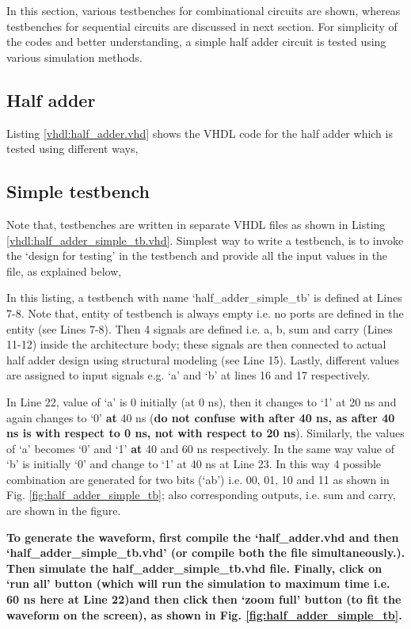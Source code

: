 In this section, various testbenches for combinational circuits are shown, whereas testbenches for sequential circuits are discussed in next section. For simplicity of the codes and better understanding, a simple half adder circuit is tested using various simulation methods. 

\subsection{Half adder}
Listing \ref{vhdl:half_adder.vhd} shows the VHDL code for the half adder which is tested using different ways, 




\subsection{Simple testbench}

Note that, testbenches are written in separate VHDL files as shown in Listing \ref{vhdl:half_adder_simple_tb.vhd}. Simplest way to write a testbench, is to invoke the `design for testing' in the testbench and provide all the input values in the file,  as explained below, 

\begin{explanation}
	In this listing, a testbench with name `half\_adder\_simple\_tb' is defined at Lines 7-8. Note that, entity of testbench is always empty i.e. no ports are defined in the entity (see Lines 7-8). Then 4 signals are defined i.e. a, b, sum and carry (Lines 11-12) inside the architecture body; these signals are then connected to actual half adder design using structural modeling (see Line 15). Lastly, different values are assigned to input signals e.g. `a' and `b' at lines 16 and 17 respectively. 
	
	In Line 22, value of `a' is 0 initially (at 0 ns), then it changes to `1' at 20 ns and again changes to `0' \textbf{at} 40 ns (\textbf{do not confuse with after 40 ns, as after 40 ns is with respect to 0 ns, not with respect to 20 ns}). Similarly, the values of `a' becomes `0' and `1' \textbf{at} 40 and 60 ns respectively. In the same way value of `b' is initially `0' and change to `1' at 40 ns at Line 23. In this way 4 possible combination are generated for two bits (`ab') i.e. 00, 01, 10 and 11 as shown in Fig. \ref{fig:half_adder_simple_tb}; also corresponding outputs, i.e. sum and carry, are shown in the figure. 
	
	\textbf{To generate the waveform, first compile the `half\_adder.vhd and then `half\_adder\_simple\_tb.vhd' (or compile both the file simultaneously.). Then simulate the half\_adder\_simple\_tb.vhd file. Finally, click on `run all' button (which will run the simulation to maximum time i.e. 60 ns here at Line 22)and then click then `zoom full' button (to fit the waveform on the screen), as shown in Fig. \ref{fig:half_adder_simple_tb}.}
\end{explanation}

